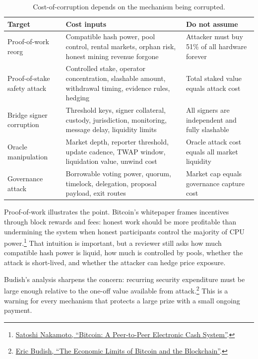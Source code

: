 \begin{table}[htbp]
\centering
\small
\renewcommand{\arraystretch}{1.16}
\begin{tabularx}{\textwidth}{@{}>{\RaggedRight\arraybackslash}p{}>{\RaggedRight\arraybackslash}p{}X@{}}
\toprule
Target & Cost inputs & Do not assume \\
\midrule
Proof-of-work reorg & Compatible hash power, pool control, rental markets, orphan risk, honest mining revenue forgone & Attacker must buy 51\% of all hardware forever \\
Proof-of-stake safety attack & Controlled stake, operator concentration, slashable amount, withdrawal timing, evidence rules, hedging & Total staked value equals attack cost \\
Bridge signer corruption & Threshold keys, signer collateral, custody, jurisdiction, monitoring, message delay, liquidity limits & All signers are independent and fully slashable \\
Oracle manipulation & Market depth, reporter threshold, update cadence, TWAP window, liquidation value, unwind cost & Oracle attack cost equals all market liquidity \\
Governance attack & Borrowable voting power, quorum, timelock, delegation, proposal payload, exit routes & Market cap equals governance capture cost \\
\bottomrule
\end{tabularx}
\caption{Cost-of-corruption depends on the mechanism being corrupted.}
\end{table}

Proof-of-work illustrates the point. Bitcoin's whitepaper frames incentives through block rewards and fees: honest work should be more profitable than undermining the system when honest participants control the majority of CPU power.\footnote{\href{https://bitcoin.org/bitcoin.pdf}{Satoshi Nakamoto, ``Bitcoin: A Peer-to-Peer Electronic Cash System''}.} That intuition is important, but a reviewer still asks how much compatible hash power is liquid, how much is controlled by pools, whether the attack is short-lived, and whether the attacker can hedge price exposure.

Budish's analysis sharpens the concern: recurring security expenditure must be large enough relative to the one-off value available from attack.\footnote{\href{https://www.nber.org/papers/w24717}{Eric Budish, ``The Economic Limits of Bitcoin and the Blockchain''}.} This is a warning for every mechanism that protects a large prize with a small ongoing payment.

